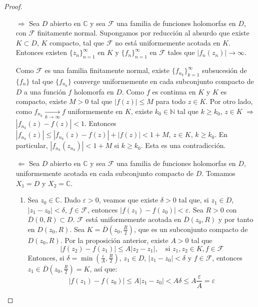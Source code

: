 \begin{proof}
    \hfill
    \begin{itemize}
        \item[$\Rightarrow$] Sea $D$ abierto en $\mathbb{C}$ y sea $\mathcal{F}$ una familia de funciones holomorfas en $D$, con $\mathcal{F}$ finitamente normal.
            Supongamos por reducción al absurdo que existe $K \subset D$, $K$ compacto, tal que $\mathcal{F}$ no está uniformemente acotada en $K$.
            Entonces existen $\{z_n\}_{n=1}^\infty$ en $K$ y $\{f_n\}_{n=1}^\infty$ en $\mathcal{F}$ tales que $|f_n(z_n)| \to \infty$.

            Como $\mathcal{F}$ es una familia finitamente normal, existe $\{f_{n_k}\}_{k=1}^\infty$ subsucesión de $\{f_n\}$ tal que $\{f_{n_k}\}$ converge uniformemente en cada subconjunto compacto de $D$ a una función $f$ holomorfa en $D$.
            Como $f$ es continua en $K$ y $K$ es compacto, existe $M > 0$ tal que $|f(z)| \leq M$ para todo $z \in K$.
            Por otro lado, como $f_{n_k} \xrightarrow[k \to \infty]{} f$ uniformemente en $K$, existe $k_0 \in \mathbb{N}$ tal que $k \geq k_0$, $z \in K$ $\Rightarrow$ $|f_{n_k}(z)-f(z)| < 1$.
            Entonces $|f_{n_k}(z)| \leq |f_{n_k}(z)-f(z)| + |f(z)| < 1 + M$, $z \in K$, $k \geq k_0$.
            En particular, $|f_{n_k}(z_{n_k})| < 1 + M$ si $k \geq k_0$.
            Esta es una contradicción.

        \item[$\Leftarrow$] Sea $D$ abierto en $\mathbb{C}$ y sea $\mathcal{F}$ una familia de funciones holomorfas en $D$, uniformemente acotada en cada subconjunto compacto de $D$.
            Tomamos $X_1 = D$ y $X_2 = \mathbb{C}$.

            \begin{enumerate}
                \item Sea $z_0 \in \mathbb{C}$.
                      Dado $\varepsilon > 0$, veamos que existe $\delta > 0$ tal que, si $z_1 \in D$, $|z_1-z_0| < \delta$, $f \in \mathcal{F}$, entonces $|f(z_1) - f(z_0)| < \varepsilon$.
                      Sea $R > 0$ con $\overline{D}(0, R) \subset D$.
                      $\mathcal{F}$ está uniformemente acotada en $\overline{D}(z_0, R)$ y por tanto en $D(z_0, R)$.
                      Sea $K = \overline{D}(z_0, \frac{R}{2})$, que es un subconjunto compacto de $D(z_0, R)$.
                      Por la proposición anterior, existe $A > 0$ tal que
                      $$|f(z_2) - f(z_1)| \leq A|z_2-z_1|, \quad \text{si } z_1, z_2 \in K, f \in \mathcal{F}$$
                      Entonces, si $\delta = \min \left(\frac{\varepsilon}{A}, \frac{R}{2}\right)$, $z_1 \in D$, $|z_1-z_0| < \delta$ y $f \in \mathcal{F}$, entonces $z_1 \in \overline{D}(z_0, \frac{R}{2}) = K$, así que:
                      $$|f(z_1) - f(z_0)| \leq A|z_1-z_0| < A\delta \leq A\frac{\varepsilon}{A} = \varepsilon$$


\end{enumerate}
\end{itemize}
\end{proof}

